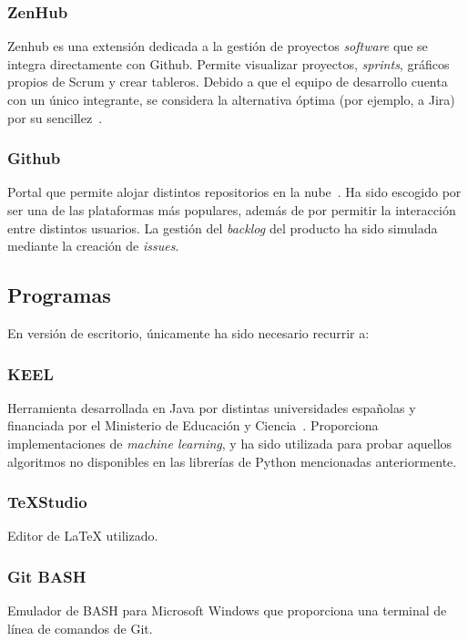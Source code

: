 \subsubsection{ZenHub}

Zenhub es una extensión dedicada a la gestión de proyectos \textit{software} que se integra directamente con Github. Permite visualizar proyectos, \textit{sprints}, gráficos propios de Scrum y crear tableros. Debido a que el equipo de desarrollo cuenta con un único integrante, se considera la alternativa óptima (por ejemplo, a Jira) por su sencillez~\cite{zenhubHome}.

\subsubsection{Github}

Portal que permite alojar distintos repositorios en la nube~\cite{githubHome}. Ha sido escogido por ser una de las plataformas más populares, además de por permitir la interacción entre distintos usuarios. La gestión del \textit{backlog} del producto ha sido simulada mediante la creación de \textit{issues}.


\subsection{Programas}

En versión de escritorio, únicamente ha sido necesario recurrir a:

\subsubsection{KEEL}

Herramienta desarrollada en Java por distintas universidades españolas y financiada por el Ministerio de Educación y Ciencia~\cite{keelRepo}. Proporciona implementaciones de \textit{machine learning}, y ha sido utilizada para probar aquellos algoritmos no disponibles en las librerías de Python mencionadas anteriormente.

\subsubsection{\TeX{}Studio}
Editor de \LaTeX{} utilizado.

\subsubsection{Git BASH}
Emulador de BASH para Microsoft Windows que proporciona una terminal de línea de comandos de Git.

